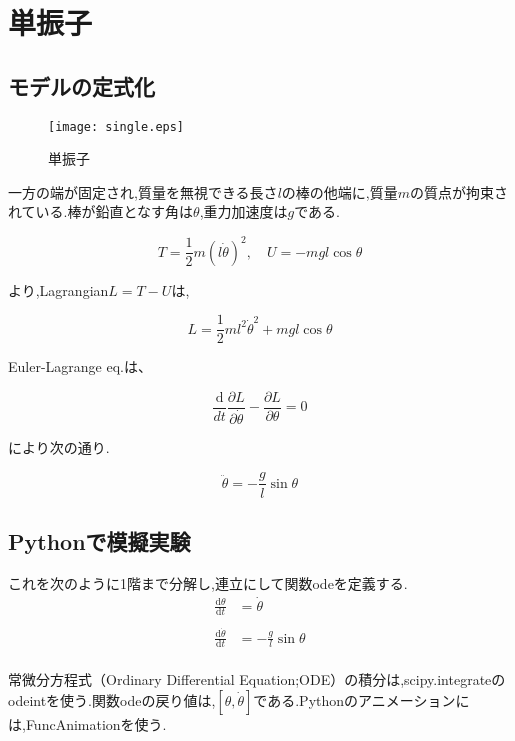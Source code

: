 \chapter{単振子}

\section{モデルの定式化}

\begin{figure}[htbp]
  \begin{minipage}[b]{0.45\linewidth}
    \centering
    \texttt{[image: single.eps]}
    \caption{単振子}
  \end{minipage}
\end{figure}

一方の端が固定され,質量を無視できる長さ$l$の棒の他端に,質量$m$の質点が拘束されている.棒が鉛直となす角は$\theta$,重力加速度は$g$である.

\[
\displaystyle T=\frac{1}{2}m(l\dot{\theta})^2,\quad U=-mgl\cos\theta
\]

より,Lagrangian$L=T-U$は,

\[
\displaystyle L=\frac{1}{2}ml^2\dot{\theta}^2+mgl\cos\theta
\]

Euler-Lagrange eq.は、

\[
\displaystyle\frac{\mathrm{d}}{dt}\frac{\partial L}{\partial \dot{\theta}}-\frac{\partial L}{\partial \theta}=0
\]

により次の通り.

\[
\displaystyle\ddot{\theta}=-\frac{g}{l}\sin\theta
\]

\section{Pythonで模擬実験}

これを次のように1階まで分解し,連立にして関数odeを定義する.\\

\begin{align*}
\displaystyle\frac{\mathrm{d}\theta}{\mathrm{d}t}&=\dot{\theta}\\\\
\displaystyle\frac{\mathrm{d}\dot{\theta}}{\mathrm{d}t}&=-\displaystyle\frac{g}{l}\sin\theta
\end{align*}\\

常微分方程式（Ordinary Differential Equation;ODE）の積分は,scipy.integrateのodeintを使う.関数odeの戻り値は,$[\theta,\dot{\theta}]$である.Pythonのアニメーションには,FuncAnimationを使う.

\lstset{escapechar=@,style=custompy}


